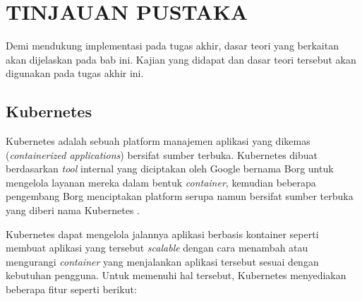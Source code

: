 \chapter{TINJAUAN PUSTAKA}
\label{chap:tinjauanpustaka}


Demi mendukung implementasi pada tugas akhir, dasar teori
yang berkaitan akan dijelaskan pada bab ini.
Kajian yang didapat dan dasar teori tersebut
akan digunakan pada tugas akhir ini.

\section{Kubernetes}
\label{sec:kubernetes}

Kubernetes adalah sebuah platform manajemen aplikasi yang dikemas (\emph{containerized applications})
bersifat sumber terbuka. Kubernetes dibuat berdasarkan \emph{tool} internal yang
diciptakan oleh Google bernama Borg untuk mengelola layanan mereka dalam bentuk \emph{container},
kemudian beberapa pengembang Borg menciptakan platform serupa
namun bersifat sumber terbuka yang diberi nama Kubernetes \parencite{borg-references}.

Kubernetes dapat mengelola jalannya aplikasi berbasis kontainer seperti membuat
aplikasi yang tersebut \emph{scalable} dengan cara menambah atau mengurangi \emph{container}
yang menjalankan aplikasi tersebut sesuai dengan kebutuhan pengguna. Untuk memenuhi
hal tersebut, Kubernetes menyediakan beberapa fitur seperti berikut:

